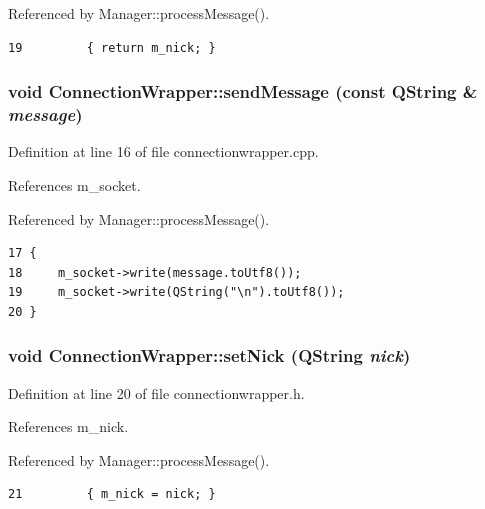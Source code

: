 Referenced by Manager::processMessage().

\begin{Code}\begin{verbatim}19         { return m_nick; }
\end{verbatim}
\end{Code}


\subsubsection{\setlength{\rightskip}{0pt plus 5cm}void ConnectionWrapper::sendMessage (const QString \& {\em message})\hspace{0.3cm}{\tt  [slot]}}\label{classConnectionWrapper_65832cee1ad7a8b63fdd9699c3b4d385}




Definition at line 16 of file connectionwrapper.cpp.

References m\_\-socket.

Referenced by Manager::processMessage().

\begin{Code}\begin{verbatim}17 {
18     m_socket->write(message.toUtf8());
19     m_socket->write(QString("\n").toUtf8());
20 }
\end{verbatim}
\end{Code}


\subsubsection{\setlength{\rightskip}{0pt plus 5cm}void ConnectionWrapper::setNick (QString {\em nick})\hspace{0.3cm}{\tt  [inline]}}\label{classConnectionWrapper_90c17fc8bc745498c6e2454a053fc906}




Definition at line 20 of file connectionwrapper.h.

References m\_\-nick.

Referenced by Manager::processMessage().

\begin{Code}\begin{verbatim}21         { m_nick = nick; }
\end{verbatim}
\end{Code}


